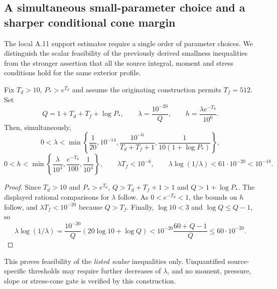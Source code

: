 \subsection*{A simultaneous small-parameter choice and a sharper conditional cone margin}
\label{subsec:a11-joint-smallness-20261021}
The local A.11 support estimates require a single order of parameter choices. We distinguish the scalar feasibility of the previously derived smallness inequalities from the stronger assertion that all the source integral, moment and stress conditions hold for the same exterior profile.

\begin{proposition}
\label{prop:a11-smallness-wedge}
Fix $T_d>10$, $P_*>e^{T_d}$ and assume the originating construction permits $T_f=512$. Set
\[
Q=1+T_d+T_f+\log P_*,\qquad
\lambda=\frac{10^{-20}}{Q},\qquad
h=\frac{\lambda e^{-T_d}}{10^6}.
\]
Then, simultaneously,
\[
0<\lambda<
\min\left\{\frac1{20},10^{-14},
\frac{10^{-6}}{T_d+T_f+1},
\frac1{10(1+\log P_*)}\right\},
\]
\[
0<h<\min\left\{\frac{\lambda}{10^4},
\frac{e^{-T_d}}{100},\frac1{10^4}\right\},
\qquad \lambda T_f<10^{-6},\qquad
\lambda\log(1/\lambda)<61\cdot10^{-20}<10^{-18}.
\]
\end{proposition}
\begin{proof}
Since $T_d>10$ and $P_*>e^{T_d}$, $Q>T_d+T_f+1>1$ and $Q>1+\log P_*$. The displayed rational comparisons for $\lambda$ follow. As $0<e^{-T_d}<1$, the bounds on $h$ follow, and $\lambda T_f<10^{-20}$ because $Q>T_f$.
Finally, $\log 10<3$ and $\log Q\le Q-1$, so
\[
\lambda\log(1/\lambda)
=\frac{10^{-20}}Q(20\log10+\log Q)
<10^{-20}\frac{60+Q-1}Q\le60\cdot10^{-20}.
\]
\end{proof}
This proves feasibility of the \emph{listed scalar} inequalities only.
Unquantified source-specific thresholds may require further decreases
of $\lambda$, and no moment, pressure, slope or stress-cone gate is
verified by this construction.

